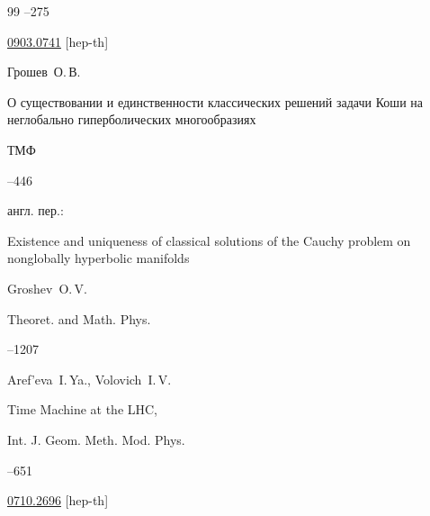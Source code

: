 \begin{thebibliography}{99}
--275

\arxiv \href{http://arxiv.org/abs/0903.0741}{0903.0741}  [hep-th]






\by Грошев~О.\,В.

\paper О существовании и единственности классических решений задачи Коши на неглобально гиперболических многообразиях

\jour ТМФ




--446

\transl англ. пер.:~

\paper Existence and uniqueness of classical solutions of the Cauchy problem on nonglobally hyperbolic manifolds

\by Groshev~O.\,V. 

\jour Theoret. and Math. Phys.




--1207




\by Aref'eva~I.\,Ya., Volovich~I.\,V.

\paper Time Machine at the LHC,

\jour Int. J. Geom. Meth. Mod. Phys.



--651


\arxiv \href{http://arxiv.org/abs/0710.2696}{0710.2696}  [hep-th]







\end{thebibliography}







\hskip6.5cm \thedate \par

\hskip6.5cm\therevdate\par







\makeengtitle



\newpage



%

